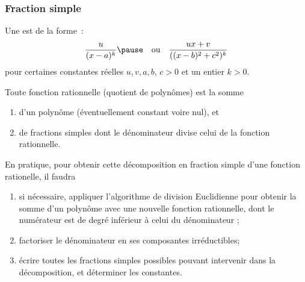 \subsubsection{Fraction simple}
\begin{frame}
  \begin{definition}
    Une  est de la forme~:\pause{}
    \begin{equation*}
      \frac{u}{(x-a)^{k}}\pause \quad\text{ou}\quad \frac{ux + v}{((x-b)^{2} + c^{2})^{k}}
    \end{equation*}
    pour certaines constantes réelles \(u,v,a,b\), \(c > 0\) et un entier \(k > 0\).
  \end{definition}\pause{}
  \begin{proposition}
    Toute fonction rationnelle (quotient de polynômes) est la somme\pause{}
    \begin{enumerate}
    \item d'un polynôme (éventuellement constant voire nul),\pause{} et
    \item de fractions simples\pause{} dont le dénominateur divise celui de la fonction rationnelle.
    \end{enumerate}
  \end{proposition}
\end{frame}

\begin{frame}
En pratique, pour obtenir cette décomposition en fraction simple d'une fonction rationelle, il faudra
\begin{enumerate}
\item si nécessaire, appliquer l'algorithme de division Euclidienne pour obtenir la somme d'un polynôme avec une nouvelle fonction rationnelle, dont le numérateur est de degré inférieur à celui du dénominateur ;
\item factoriser le dénominateur en ses composantes irréductibles;
\item écrire toutes les fractions simples possibles pouvant intervenir dans la décomposition, et déterminer les constantes.
\end{enumerate}
\end{frame}
